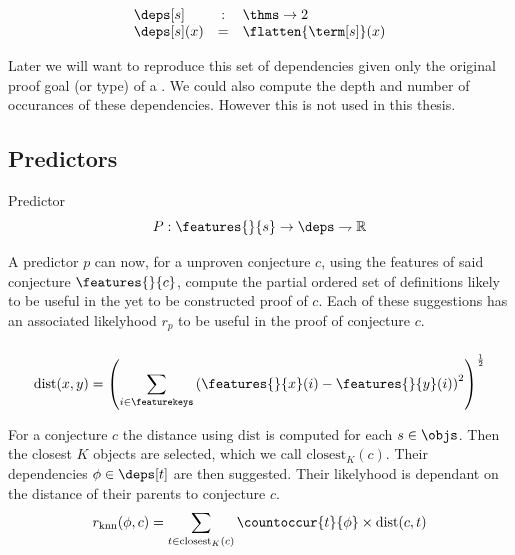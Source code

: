 \begin{definition}\label{def:deps}
  $$
  \begin{array}{lcl}
    \deps[s] & : & \thms \rightarrow 2 \\
    \deps[s](x) & = & \flatten{\term[s]}(x)
  \end{array}
  $$
\end{definition}

Later we will want to reproduce this set of dependencies given only the original proof goal (or type) of a \coqobj.
We could also compute the depth and number of occurances of these dependencies.
However this is not used in this thesis.

\subsection{Predictors}

\begin{definition}{Predictor}
  \[ P : \features{}{s} \rightarrow \deps \rightharpoondown \mathbb{R} \]
\end{definition}

A predictor $p$ can now, for a unproven conjecture $c$,
using the features of said conjecture $\features{}{c}$,
compute the partial ordered set of definitions likely to be useful in the yet to be constructed proof of $c$.
Each of these suggestions has an associated likelyhood $r_p$ to be useful in the proof of conjecture $c$.

\subsubsection{\knn}
$$ \text{dist}(x, y) = \left( \sum_{i \in \featurekeys} \left( \features{}{x}(i) - \features{}{y}(i) \right)^2 \right)^{\frac{1}{2}} $$

For a conjecture $c$ the distance using $\text{dist}$ is computed for each \coqobj $s \in \objs$.
Then the closest $K$ objects are selected, which we call $\text{closest}_K(c)$.
Their dependencies $\phi \in \deps[t]$ are then suggested.
Their likelyhood is dependant on the distance of their parents to conjecture $c$.
\[ r_\text{knn}(\phi, c) = \sum_{t \in \text{closest}_K(c)} \countoccur{t}{\phi} \times \text{dist}(c, t) \]

\subsubsection{\nb}

